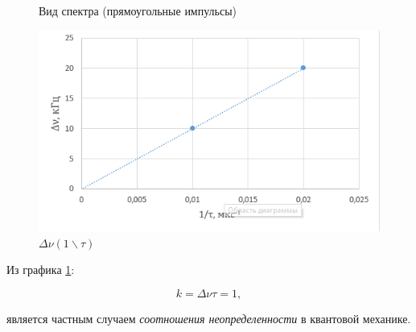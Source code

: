 \documentclass[a4paper, 12pt]{article}
\begin{document}
\begin{figure}[h!]
	\centering
\caption{Вид спектра (прямоугольные импульсы)}
\end{figure}

\begin{figure}[h!]
\begin{center}
\includegraphics[scale=0.8]{nu(1t).png}
\end{center}
\caption{$\Delta \nu (1 \backslash \tau)$}
\label{nu(1/t)}
\end{figure}


Из графика \ref{nu(1/t)}:

\[k = \Delta \nu \tau = 1,\]

 является частным случаем \textit{соотношения неопределенности} в квантовой механике.
\end{document}
